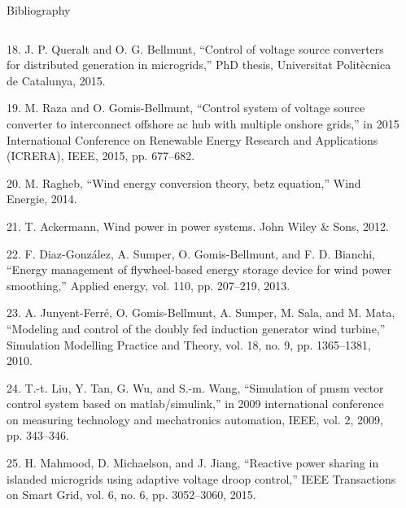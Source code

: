 \begin{frame}{Bibliography}
  \tiny
  \justifying
\begin{columns}
\begin{column}{0.5\textwidth}
  \parbox{1\textwidth}{
  18. J. P. Queralt and O. G. Bellmunt, “Control of voltage source converters for distributed generation in microgrids,” PhD thesis, Universitat Politècnica de Catalunya, 2015.
  \vspace{0.1cm}

  19. M. Raza and O. Gomis-Bellmunt, “Control system of voltage source converter to interconnect offshore ac hub with multiple onshore grids,” in 2015 International Conference on Renewable Energy Research and Applications (ICRERA), IEEE, 2015, pp. 677–682.
  \vspace{0.1cm}

  20. M. Ragheb, “Wind energy conversion theory, betz equation,” Wind Energie, 2014.
  \vspace{0.1cm}

  21. T. Ackermann, Wind power in power systems. John Wiley \& Sons, 2012.
  \vspace{0.1cm}

  22. F. Diaz-González, A. Sumper, O. Gomis-Bellmunt, and F. D. Bianchi, “Energy management of flywheel-based energy storage device for wind power smoothing,” Applied energy, vol. 110, pp. 207–219, 2013.
  \vspace{0.1cm}

  23. A. Junyent-Ferré, O. Gomis-Bellmunt, A. Sumper, M. Sala, and M. Mata, “Modeling and control of the doubly fed induction generator wind turbine,” Simulation Modelling Practice and Theory, vol. 18, no. 9, pp. 1365–1381, 2010.
  \vspace{0.1cm}

  24. T.-t. Liu, Y. Tan, G. Wu, and S.-m. Wang, “Simulation of pmsm vector control system based on matlab/simulink,” in 2009 international conference on measuring technology and mechatronics automation, IEEE, vol. 2, 2009, pp. 343–346.
  \vspace{0.1cm}

  25. H. Mahmood, D. Michaelson, and J. Jiang, “Reactive power sharing in islanded microgrids using adaptive voltage droop control,” IEEE Transactions on Smart Grid, vol. 6, no. 6, pp. 3052–3060, 2015.
  \vspace{0.95cm}

}
\end{column}

\begin{column}{0.5\textwidth}

\end{column}
\end{columns}

\end{frame}






